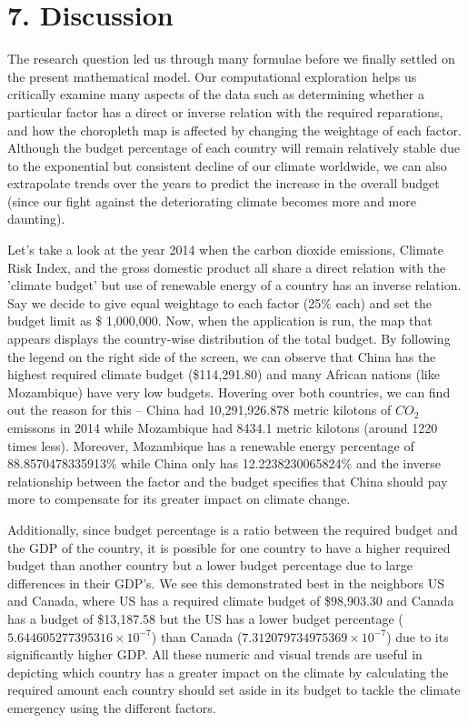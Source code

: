 \documentclass[fontsize=11pt]{article}
\begin{document}
    \section*{7. Discussion}
    \quad The research question led us through many formulae before we finally settled on the present mathematical model. 
    Our computational exploration helps us critically examine many aspects of the data such as determining whether a particular factor 
    has a direct or inverse relation with the required reparations, and how the choropleth map is affected by changing the weightage of each factor. 
    Although the budget percentage of each country will remain relatively stable due to the exponential but consistent decline of our climate worldwide, 
    we can also extrapolate trends over the years to predict the increase in the overall budget (since our fight against the deteriorating climate 
    becomes more and more daunting).
    \newline
    
    Let's take a look at the year 2014 when the carbon dioxide emissions, Climate Risk Index, and the gross domestic product all share 
    a direct relation with the 'climate budget' but use of renewable energy of a country has an inverse relation. Say we decide to give 
    equal weightage to each factor (25\% each) and set the budget limit as \$ 1,000,000. Now, when the application is run, the map that 
    appears displays the country-wise distribution of the total budget. By following the legend on the right side of the screen, we can 
    observe that China has the highest required climate budget (\$114,291.80) and many African nations (like Mozambique) have very low 
    budgets. Hovering over both countries, we can find out the reason for this -- China had 10,291,926.878 metric kilotons of $CO_2$ emissons 
    in 2014 while Mozambique had 8434.1 metric kilotons (around 1220 times less). Moreover, Mozambique has a renewable energy percentage 
    of 88.8570478335913\% while China only has 12.2238230065824\% and the inverse relationship between the factor and the budget 
    specifies that China should pay more to compensate for its greater impact on climate change.
    \newline
    
    Additionally, since budget percentage is a ratio between the required budget and the GDP of the country, it is possible for one 
    country to have a higher required budget than another country but a lower budget percentage due to large differences in their GDP's. 
    We see this demonstrated best in the neighbors US and Canada, where US has a required climate budget of \$98,903.30 and Canada has a 
    budget of \$13,187.58 but the US has a lower budget percentage ($5.644605277395316 \times 10^{-7}$) than Canada 
    ($7.312079734975369 \times 10^{-7}$) due to its significantly higher GDP. All these numeric and visual trends are useful in depicting 
    which country has a greater impact on the climate by calculating the required amount each country should set aside in its budget to 
    tackle the climate emergency using the different factors. 
    \newline
    
\end{document}
